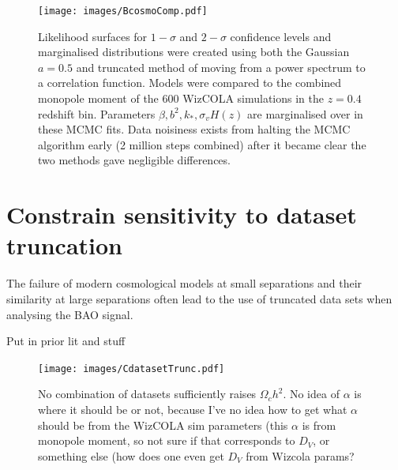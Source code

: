 \documentclass[titlesmallcaps, examinerscopy, copyrightpage]{uqthesis}
\begin{document}
\begin{appendices}
\begin{figure}[h!]
  \begin{center}
    \texttt{[image: images/BcosmoComp.pdf]}
  \end{center}
  \caption{Likelihood surfaces for $1-\sigma$ and $2-\sigma$ confidence levels and marginalised distributions were created using both the Gaussian $a=0.5$ and truncated method of moving from a power spectrum to a correlation function. Models were compared to the combined monopole moment of the 600 WizCOLA simulations in the $z=0.4$ redshift bin. Parameters $\beta, b^2, k_*, \sigma_v H(z)$ are marginalised over in these MCMC fits. Data noisiness exists from halting the MCMC algorithm early (2 million steps combined) after it became clear the two methods gave negligible differences.}
  \label{fig:BcosmoTest}
\end{figure}


\chapter{Constrain sensitivity to dataset truncation} \label{app:truncation}

The failure of modern cosmological models at small separations and their similarity at large separations often lead to the use of truncated data sets when analysing the BAO signal. 

Put in prior lit and stuff




\begin{figure}[h!]
  \begin{center}
    \texttt{[image: images/CdatasetTrunc.pdf]}
  \end{center}
  \caption{No combination of datasets sufficiently raises $\Omega_c h^2$. No idea of $\alpha$ is where it should be or not, because I've no idea how to get what $\alpha$ should be from the WizCOLA sim parameters (this $\alpha$ is from monopole moment, so not sure if that corresponds to $D_V$, or something else (how does one even get $D_V$ from Wizcola params?}
  \label{fig:CdatasetTrunc}
\end{figure}






\end{appendices}


\end{document}
